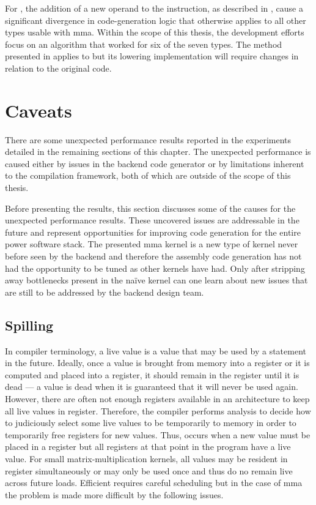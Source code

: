\documentclass[\main/thesis.tex]{subfiles}
\begin{document}
For , the addition of a new operand to the instruction, as described in , cause a significant divergence in code-generation logic that otherwise applies to all other types usable with \gls{mma}.
Within the scope of this thesis, the development efforts focus on an algorithm that worked for six of the seven types.
The method presented in  applies to  but its \gls{lowering} implementation will require changes in relation to the original code.

\section{Caveats}
\label{sec:caveats}
There are some unexpected performance results reported in the experiments detailed in the remaining sections of this chapter.
The unexpected performance is caused either by issues in the backend code generator or by limitations inherent to the compilation framework, both of which are outside of the scope of this thesis.

Before presenting the results, this section discusses some of the causes for the unexpected performance results.
These uncovered issues are addressable in the future and represent opportunities for improving code generation for the entire \gls{power} software stack.
The presented \gls{mma} kernel is a new type of kernel never before seen by the backend and therefore the assembly code generation has not had the opportunity to be tuned as other kernels have had.
Only after stripping away bottlenecks present in the na\"ive kernel can one learn about new issues that are still to be addressed by the backend design team.

\subsection{Spilling}
In compiler terminology, a \gls{live} value is a value that may be used by a statement in the future.
Ideally, once a value is brought from memory into a register or it is computed and placed into a register, it should remain in the register until it is \gls{dead} --- a value is dead when it is guaranteed that it will never be used again.
However, there are often not enough registers available in an architecture to keep all live values in register.
Therefore, the compiler performs analysis to decide how to judiciously select some live values to be temporarily  to memory in order to temporarily free registers for new values.
Thus,  occurs when a new value must be placed in a register but all registers at that \gls{point} in the program have a \gls{live} value.
For small matrix-multiplication kernels, all values may be resident in register simultaneously or may only be used once and thus do no remain \gls{live} across future loads.
Efficient  requires careful scheduling but in the case of \gls{mma} the problem is made more difficult by the following issues.
\end{document}
